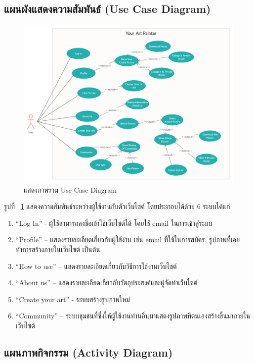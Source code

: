 \documentclass[12pt,oneside,openright,a4paper]{cpe-thai-project}
\begin{document}
\newpage
\subsection{แผนผังแสดงความสัมพันธ์ (Use Case Diagram)}

\begin{figure}[!h]
  \centering
  \includegraphics[width=15cm]{./image/use-case.png}
  \caption{แสดงภาพรวม Use Case Diagram}
  \label{fig:usecase}
\end{figure}

รูปที่ ~\ref{fig:usecase} แสดงความสัมพันธ์ระหว่างผู้ใช้งานกับตัวเว็บไซต์ โดยประกอบได้ด้วย 6 ระบบได้แก่


\begin{enumerate}
  \item “Log In” - ผู้ใช้สามารถลงชื่อเข้าใช้เว็บไซต์ได้ โดยใช้ email ในการเข้าสู่ระบบ
  \item “Profile” – แสดงรายละเอียดเกี่ยวกับผู้ใช้ง่าน เช่น email ที่ใช้ในการสมัคร, รูปภาพที่เคยทำการสร้างภายในเว็บไซต์ เป็นต้น
  \item “How to use” – แสดงรายละเอียดเกี่ยวกับวิธีการใช้งานเว็บไซต์
  \item “About us” – แสดงรายละเอียดเกี่ยวกับวัตถุประสงค์และผู้จัดทำเว็บไซต์ 
  \item “Create your art” - ระบบสร้างรูปภาพใหม่
  \item “Community” – ระบบชุมชนที่ซึ่งให้ผู้ใช้งานท่านอื่นมาแสดงรูปภาพที่ตนเองสร้างขึ้นมาภายในเว็บไซต์
\end{enumerate}

\newpage
\subsection{แผนภาพกิจกรรม (Activity Diagram)}
\end{document}
